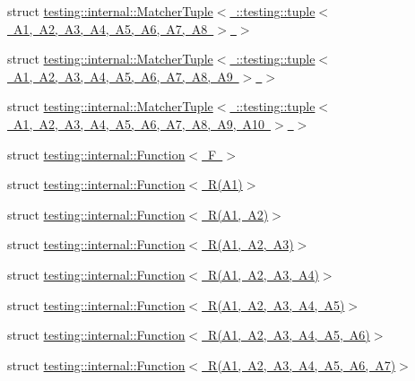 \begin{DoxyCompactItemize}
\item 
struct \mbox{\hyperlink{structtesting_1_1internal_1_1MatcherTuple_3_01_1_1testing_1_1tuple_3_01A1_00_01A2_00_01A3_00_01Aed2bba98e2ef5f11a8df3506707ec6d8}{testing\+::internal\+::\+Matcher\+Tuple$<$ \+::testing\+::tuple$<$ A1, A2, A3, A4, A5, A6, A7, A8 $>$ $>$}}
\item 
struct \mbox{\hyperlink{structtesting_1_1internal_1_1MatcherTuple_3_01_1_1testing_1_1tuple_3_01A1_00_01A2_00_01A3_00_01Aa73012c63a4e11ec83732b0fb70972c7}{testing\+::internal\+::\+Matcher\+Tuple$<$ \+::testing\+::tuple$<$ A1, A2, A3, A4, A5, A6, A7, A8, A9 $>$ $>$}}
\item 
struct \mbox{\hyperlink{structtesting_1_1internal_1_1MatcherTuple_3_01_1_1testing_1_1tuple_3_01A1_00_01A2_00_01A3_00_01Aa256ea461b02eca0db9561b7bbf2c82d}{testing\+::internal\+::\+Matcher\+Tuple$<$ \+::testing\+::tuple$<$ A1, A2, A3, A4, A5, A6, A7, A8, A9, A10 $>$ $>$}}
\item 
struct \mbox{\hyperlink{structtesting_1_1internal_1_1Function}{testing\+::internal\+::\+Function$<$ F $>$}}
\item 
struct \mbox{\hyperlink{structtesting_1_1internal_1_1Function_3_01R_07A1_08_4}{testing\+::internal\+::\+Function$<$ R(\+A1)$>$}}
\item 
struct \mbox{\hyperlink{structtesting_1_1internal_1_1Function_3_01R_07A1_00_01A2_08_4}{testing\+::internal\+::\+Function$<$ R(\+A1, A2)$>$}}
\item 
struct \mbox{\hyperlink{structtesting_1_1internal_1_1Function_3_01R_07A1_00_01A2_00_01A3_08_4}{testing\+::internal\+::\+Function$<$ R(\+A1, A2, A3)$>$}}
\item 
struct \mbox{\hyperlink{structtesting_1_1internal_1_1Function_3_01R_07A1_00_01A2_00_01A3_00_01A4_08_4}{testing\+::internal\+::\+Function$<$ R(\+A1, A2, A3, A4)$>$}}
\item 
struct \mbox{\hyperlink{structtesting_1_1internal_1_1Function_3_01R_07A1_00_01A2_00_01A3_00_01A4_00_01A5_08_4}{testing\+::internal\+::\+Function$<$ R(\+A1, A2, A3, A4, A5)$>$}}
\item 
struct \mbox{\hyperlink{structtesting_1_1internal_1_1Function_3_01R_07A1_00_01A2_00_01A3_00_01A4_00_01A5_00_01A6_08_4}{testing\+::internal\+::\+Function$<$ R(\+A1, A2, A3, A4, A5, A6)$>$}}
\item 
struct \mbox{\hyperlink{structtesting_1_1internal_1_1Function_3_01R_07A1_00_01A2_00_01A3_00_01A4_00_01A5_00_01A6_00_01A7_08_4}{testing\+::internal\+::\+Function$<$ R(\+A1, A2, A3, A4, A5, A6, A7)$>$}}
\item 

\end{DoxyCompactItemize}

